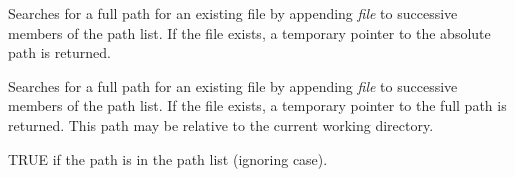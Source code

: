 

Searches for a full path for an existing file by appending {\it file} to
successive members of the path list.  If the file exists, a temporary
pointer to the absolute path is returned.



Searches for a full path for an existing file by appending {\it file} to
successive members of the path list.  If the file exists, a temporary
pointer to the full path is returned. This path may be relative to the current
working directory.



TRUE if the path is in the path list (ignoring case).


